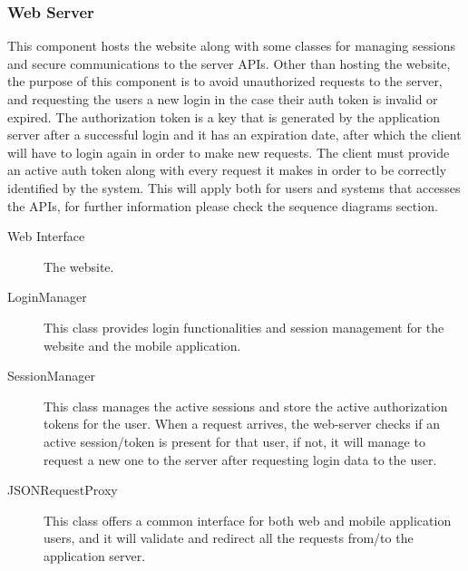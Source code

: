 \documentclass[11pt, a4paper,titlepage]{article}
\begin{document}
 \subsubsection{Web Server}
	 This component hosts the website along with some classes for managing sessions and secure communications to the server APIs. Other than hosting the website, the purpose of this component is to avoid unauthorized requests to the server, and requesting the users a new login in the case their auth token is invalid or expired.\newline
	 The authorization token is a key that is generated by the application server after a successful login and it has an expiration date, after which the client will have to login again in order to make new requests.
	 The client must provide an active auth token along with every request it makes in order to be correctly identified by the system.
	  This will apply both for users and systems that accesses the APIs, for further information please check the sequence diagrams section. 
	 \begin{description}
	 	\item[Web Interface] The website.
	 	\item[LoginManager] This class provides login functionalities and session management for the website and the mobile application.
	 	\item[SessionManager] This class manages the active sessions and store the active authorization tokens for the user. When a request arrives, the web-server checks if an active session/token is present for that user, if not, it will manage to request a new one to the server after requesting login data to the user.
	 	\item[JSONRequestProxy] This class offers a common interface for both web and mobile application users, and it will validate and redirect all the requests from/to the application server.
	 \end{description}
\end{document}
